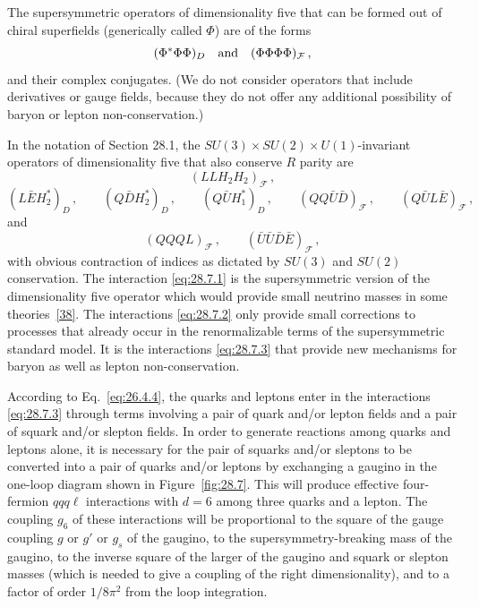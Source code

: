 The supersymmetric operators of dimensionality five that can be formed out
of chiral superfields (generically called \(\Phi\)) are of the forms
\[
  (\Phi^*\Phi\Phi)_D
  \quad\hbox{and}\quad
  (\Phi\Phi\Phi\Phi)_{\mathcal F}\,,
\]
and their complex conjugates. (We do not consider operators that include
derivatives or gauge fields, because they do not offer any additional
possibility of baryon or lepton non-conservation.)


In the notation of Section 28.1, the
\(SU(3)\times SU(2)\times U(1)\)-invariant operators of
dimensionality five that also conserve \(R\) parity are
\begin{equation}
  (LLH_2H_2)_{\mathcal F}\,,
  \tag{28.7.1}\label{eq:28.7.1}
\end{equation}
\begin{equation}
  (L\bar E H_2^*)_D\,,
  \qquad
  (Q\bar D H_2^*)_D\,,
  \qquad
  (Q\bar U H_1^*)_D\,,
  \qquad
  (QQ\bar U\bar D)_{\mathcal F}\,,
  \qquad
  (Q\bar U L\bar E)_{\mathcal F}\,,
  \tag{28.7.2}\label{eq:28.7.2}
\end{equation}
and
\begin{equation}
  (QQQL)_{\mathcal F}\,,
  \qquad
  (\bar U\bar U\bar D\bar E)_{\mathcal F}\,,
  \tag{28.7.3}\label{eq:28.7.3}
\end{equation}
with obvious contraction of indices as dictated by \(SU(3)\) and \(SU(2)\)
conservation. The interaction \eqref{eq:28.7.1} is the supersymmetric
version of the dimensionality five operator which would provide small
neutrino masses in some theories~\hyperref[ch28-ref-38]{[38]}. The interactions
\eqref{eq:28.7.2} only provide small corrections to processes that already
occur in the renormalizable terms of the supersymmetric standard model. It
is the interactions \eqref{eq:28.7.3} that provide new mechanisms for
baryon as well as lepton non-conservation.

According to Eq.~\eqref{eq:26.4.4}, the quarks and leptons enter in the
interactions \eqref{eq:28.7.3} through terms involving a pair of quark
and/or lepton fields and a pair of squark and/or slepton fields. In order to
generate reactions among quarks and leptons alone, it is necessary for the
pair of squarks and/or sleptons to be converted into a pair of quarks
and/or leptons by exchanging a gaugino in the one-loop diagram shown in
Figure~\ref{fig:28.7}. This will produce effective four-fermion \(qqq\ell\)
interactions with \(d=6\) among three quarks and a lepton. The coupling
\(g_6\) of these interactions will be proportional to the square of the
gauge coupling \(g\) or \(g'\) or \(g_s\) of the gaugino, to the
supersymmetry-breaking mass of the gaugino, to the inverse square of the
larger of the gaugino and squark or slepton masses (which is needed to give
a coupling of the right dimensionality), and to a factor of order
\(1/8\pi^2\) from the loop integration.

